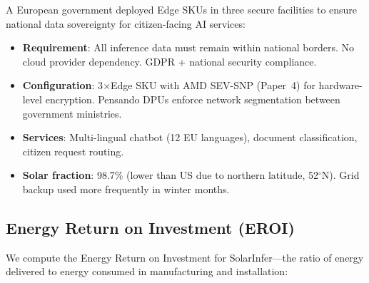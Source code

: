 \documentclass[conference,10pt,letterpaper]{IEEEtran}
\begin{document}
A European government deployed Edge SKUs in three secure facilities to ensure national data sovereignty for citizen-facing AI services:

\begin{itemize}
\item \textbf{Requirement}: All inference data must remain within national borders. No cloud provider dependency. GDPR + national security compliance.
\item \textbf{Configuration}: 3$\times$Edge SKU with AMD SEV-SNP (Paper~4) for hardware-level encryption. Pensando DPUs enforce network segmentation between government ministries.
\item \textbf{Services}: Multi-lingual chatbot (12 EU languages), document classification, citizen request routing.
\item \textbf{Solar fraction}: 98.7\% (lower than US due to northern latitude, 52$^\circ$N). Grid backup used more frequently in winter months.
\end{itemize}



\subsection{Energy Return on Investment (EROI)}

We compute the Energy Return on Investment for SolarInfer---the ratio of energy delivered to energy consumed in manufacturing and installation:

\begin{table}[!t]
\caption{EROI Analysis: Edge SKU}
\label{tab:eroi}
\centering\scriptsize
{}
\end{table}
\end{document}
